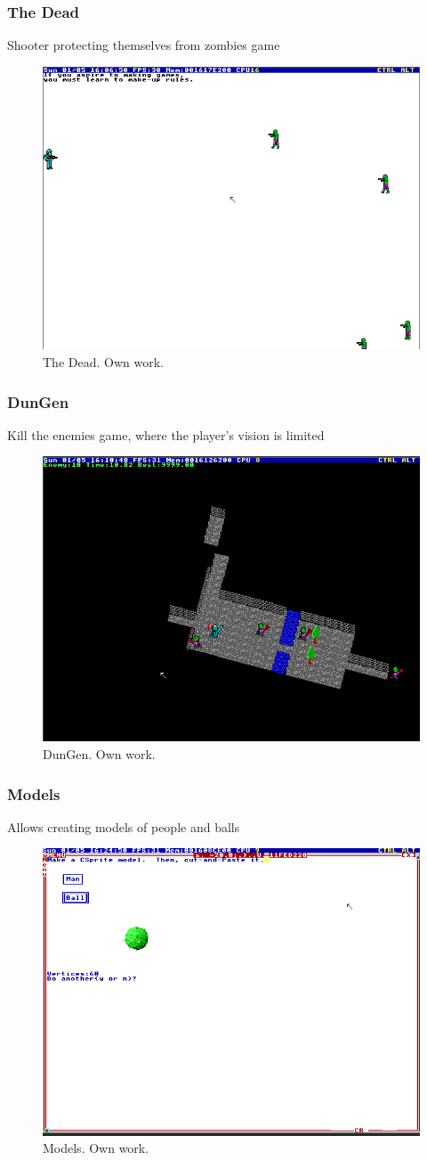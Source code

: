 \documentclass{beamer}
\begin{document}
	\begin{frame}
		\frametitle{The Dead}
		Shooter protecting themselves from zombies game
		\begin{figure}
			\centering
			\includegraphics[width=0.6\linewidth]{images/the_dead.png}
			\caption{The Dead. Own work.}
			\label{fig:the_dead}
		\end{figure}
	\end{frame}

	\begin{frame}
		\frametitle{DunGen}
		Kill the enemies game, where the player's vision is limited
		\begin{figure}
			\centering
			\includegraphics[width=0.6\linewidth]{images/dungen.png}
			\caption{DunGen. Own work.}
			\label{fig:dungen}
		\end{figure}
	\end{frame}

	\begin{frame}
		\frametitle{Models}
		Allows creating models of people and balls
		\begin{figure}
			\centering
			\includegraphics[width=0.6\linewidth]{images/models.png}
			\caption{Models. Own work.}
			\label{fig:models}
		\end{figure}
	\end{frame}
\end{document}

